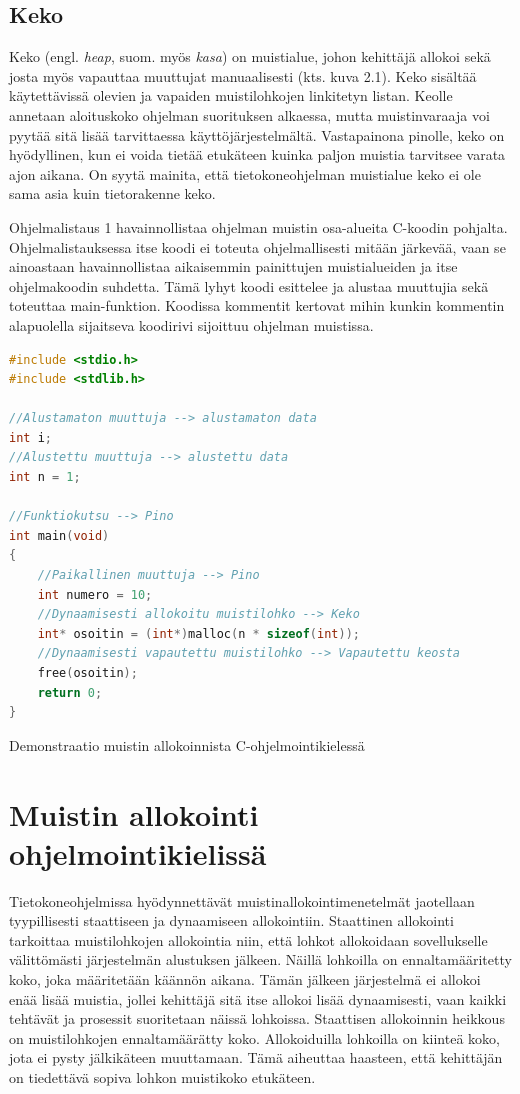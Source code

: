 \subsection{Keko}

Keko (engl. \textit{heap}, suom. myös \textit{kasa}) on muistialue, johon kehittäjä allokoi sekä josta myös vapauttaa muuttujat manuaalisesti (kts. kuva 2.1). Keko sisältää käytettävissä olevien ja vapaiden muistilohkojen linkitetyn listan. Keolle annetaan aloituskoko ohjelman suorituksen alkaessa, mutta muistinvaraaja voi pyytää sitä lisää tarvittaessa käyttöjärjestelmältä. Vastapainona pinolle, keko on hyödyllinen, kun ei voida tietää etukäteen kuinka paljon muistia tarvitsee varata ajon aikana.\cite{mmic2010} On syytä mainita, että tietokoneohjelman muistialue keko ei ole sama asia kuin tietorakenne keko.

Ohjelmalistaus 1 havainnollistaa ohjelman muistin osa-alueita C-koodin pohjalta. Ohjelmalistauksessa itse koodi ei toteuta ohjelmallisesti mitään järkevää, vaan se ainoastaan havainnollistaa aikaisemmin painittujen muistialueiden ja itse ohjelmakoodin suhdetta. Tämä lyhyt koodi esittelee ja alustaa muuttujia sekä toteuttaa main-funktion. Koodissa kommentit kertovat mihin kunkin kommentin alapuolella sijaitseva koodirivi sijoittuu ohjelman muistissa.

\begin{algorithm}[tbh]
\begin{lstlisting}[language=C]
#include <stdio.h>
#include <stdlib.h>

//Alustamaton muuttuja --> alustamaton data
int i;
//Alustettu muuttuja --> alustettu data 
int n = 1; 

//Funktiokutsu --> Pino
int main(void)  
{  
    //Paikallinen muuttuja --> Pino
    int numero = 10;
    //Dynaamisesti allokoitu muistilohko --> Keko    
    int* osoitin = (int*)malloc(n * sizeof(int));
    //Dynaamisesti vapautettu muistilohko --> Vapautettu keosta  
    free(osoitin);
    return 0;
}
\end{lstlisting}
\caption{Demonstraatio muistin allokoinnista C-ohjelmointikielessä\label{alg:Demonstraatio}}
\end{algorithm}

\section{Muistin allokointi ohjelmointikielissä}

Tietokoneohjelmissa hyödynnettävät muistinallokointimenetelmät jaotellaan tyypillisesti staattiseen ja dynaamiseen allokointiin. Staattinen allokointi tarkoittaa muistilohkojen allokointia niin, että lohkot allokoidaan sovellukselle välittömästi järjestelmän alustuksen jälkeen. Näillä lohkoilla on ennaltamääritetty koko, joka määritetään käännön aikana. Tämän jälkeen järjestelmä ei allokoi enää lisää muistia, jollei kehittäjä sitä itse allokoi lisää dynaamisesti, vaan kaikki tehtävät ja prosessit suoritetaan näissä lohkoissa. Staattisen allokoinnin heikkous on muistilohkojen ennaltamäärätty koko. Allokoiduilla lohkoilla on kiinteä koko, jota ei pysty jälkikäteen muuttamaan. Tämä aiheuttaa haasteen, että kehittäjän on tiedettävä sopiva lohkon muistikoko etukäteen.\cite{daroemmfera@2006}

